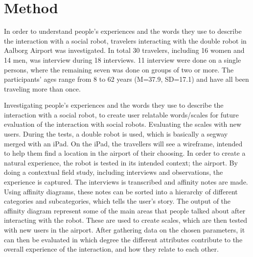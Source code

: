 \section{Method}
\label{Method}
%
In order to understand people's experiences and the words they use to describe the interaction with a social robot, travelers interacting with the double robot in Aalborg Airport was investigated. In total 30 travelers, including 16 women and 14 men, was interview during 18 interviews. 11 interview were done on a single persons, where the remaining seven was done on groups of two or more. The participants' ages range from 8 to 62 years (M=37.9, SD=17.1) and have all been traveling more than once.


Investigating people's experiences and the words they use to describe the interaction with a social robot, to create user relatable words/scales for future evaluation of the interaction with social robots. Evaluating the scales with new users.
During the tests, a double robot is used, which is basically a segway merged with an iPad. On the iPad, the travellers will see a wireframe, intended to help them find a location in the airport of their choosing.
In order to create a natural experience, the robot is tested in its intended context; the airport. By doing a contextual field study, including interviews and observations, the experience is captured. The interviews is transcribed and affinity notes are made. Using affinity diagrams, these notes can be sorted into a hierarchy of different categories and subcategories, which tells the user’s story.
The output of the affinity diagram represent some of the main areas that people talked about after interacting with the robot. These are used to create scales, which are then tested with new users in the airport. After gathering data on the chosen parameters, it can then be evaluated in which degree the different attributes contribute to the overall experience of the interaction, and how they relate to each other.